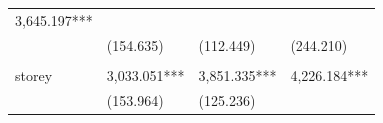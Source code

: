 \documentclass[]{book}
\begin{document}
\begin{longtable}[]{@{}llll@{}}
\begin{minipage}[t]{0.22\columnwidth}
3,645.197***\strut
\end{minipage}\tabularnewline
\begin{minipage}[t]{0.18\columnwidth}\raggedright\strut
\strut
\end{minipage} & \begin{minipage}[t]{0.24\columnwidth}\raggedright\strut
(154.635)\strut
\end{minipage} & \begin{minipage}[t]{0.24\columnwidth}\raggedright\strut
(112.449)\strut
\end{minipage} & \begin{minipage}[t]{0.22\columnwidth}\raggedright\strut
(244.210)\strut
\end{minipage}\tabularnewline
\begin{minipage}[t]{0.18\columnwidth}\raggedright\strut
\strut
\end{minipage} & \begin{minipage}[t]{0.24\columnwidth}\raggedright\strut
\strut
\end{minipage} & \begin{minipage}[t]{0.24\columnwidth}\raggedright\strut
\strut
\end{minipage} & \begin{minipage}[t]{0.22\columnwidth}\raggedright\strut
\strut
\end{minipage}\tabularnewline
\begin{minipage}[t]{0.18\columnwidth}\raggedright\strut
storey\strut
\end{minipage} & \begin{minipage}[t]{0.24\columnwidth}\raggedright\strut
3,033.051***\strut
\end{minipage} & \begin{minipage}[t]{0.24\columnwidth}\raggedright\strut
3,851.335***\strut
\end{minipage} & \begin{minipage}[t]{0.22\columnwidth}\raggedright\strut
4,226.184***\strut
\end{minipage}\tabularnewline
\begin{minipage}[t]{0.18\columnwidth}\raggedright\strut
\strut
\end{minipage} & \begin{minipage}[t]{0.24\columnwidth}\raggedright\strut
(153.964)\strut
\end{minipage} & \begin{minipage}[t]{0.24\columnwidth}\raggedright\strut
(125.236)\strut
\end{minipage} & \begin{minipage}[t]{0.22\columnwidth}\raggedright\strut

\end{minipage}
\end{longtable}
\end{document}
